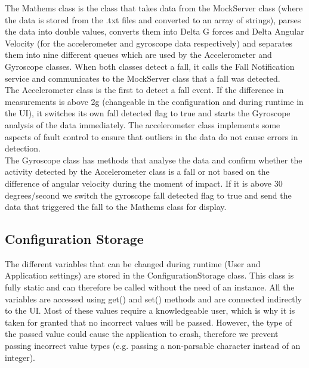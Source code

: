 \documentclass[hidelinks,conference,12pt]{IEEETran}
\begin{document}
The Mathems class is the class that takes data from the MockServer class (where the data is stored from the .txt files and converted to an array of strings), parses the data into double values, converts them into Delta G forces and Delta Angular Velocity (for the accelerometer and gyroscope data respectively) and separates them into nine different queues which are used by the Accelerometer and Gyroscope classes. When both classes detect a fall, it calls the Fall Notification service and communicates to the MockServer class that a fall was detected.\\
The Accelerometer class is the first to detect a fall event. If the difference in measurements is above 2g (changeable in the configuration and during runtime in the UI), it switches its own fall detected flag to true and starts the Gyroscope analysis of the data immediately. The accelerometer class implements some aspects of fault control to ensure that outliers in the data do not cause errors in detection.\\
The Gyroscope class has methods that analyse the data and confirm whether the activity detected by the Accelerometer class is a fall or not based on the difference of angular velocity during the moment of impact. If it is above 30 degrees/second we switch the gyroscope fall detected flag to true and send the data that triggered the fall to the Mathems class for display.

\subsection{Configuration Storage}
The different variables that can be changed during runtime (User and Application settings) are stored in the ConfigurationStorage class. This class is fully static and can therefore be called without the need of an instance. All the variables are accessed using get() and set() methods and are connected indirectly to the UI. Most of these values require a knowledgeable user, which is why it is taken for granted that no incorrect values will be passed. However, the type of the passed value could cause the application to crash, therefore we prevent passing incorrect value types (e.g. passing a non-parsable character instead of an integer).
\end{document}
